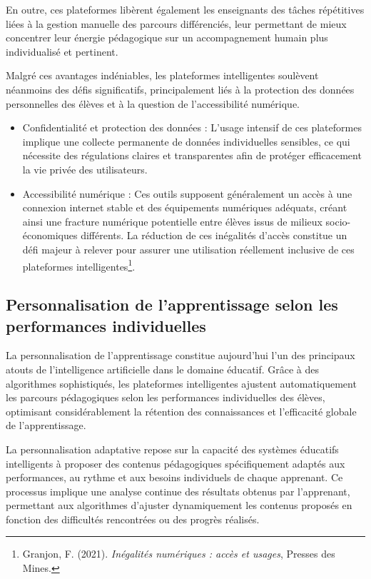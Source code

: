 \documentclass[11pt,a4paper]{report}
\begin{document}
En outre, ces plateformes libèrent également les enseignants des tâches répétitives liées à la gestion manuelle des parcours différenciés, leur permettant de mieux concentrer leur énergie pédagogique sur un accompagnement humain plus individualisé et pertinent.

Malgré ces avantages indéniables, les plateformes intelligentes soulèvent néanmoins des défis significatifs, principalement liés à la protection des données personnelles des élèves et à la question de l’accessibilité numérique.

\begin{itemize}

    \item Confidentialité et protection des données :
L’usage intensif de ces plateformes implique une collecte permanente de données individuelles sensibles, ce qui nécessite des régulations claires et transparentes afin de protéger efficacement la vie privée des utilisateurs.

    \item Accessibilité numérique :
Ces outils supposent généralement un accès à une connexion internet stable et des équipements numériques adéquats, créant ainsi une fracture numérique potentielle entre élèves issus de milieux socio-économiques différents. La réduction de ces inégalités d’accès constitue un défi majeur à relever pour assurer une utilisation réellement inclusive de ces plateformes intelligentes\footnote{Granjon, F. (2021). \textit{Inégalités numériques : accès et usages}, Presses des Mines.}.

\end{itemize}

\subsection{Personnalisation de l’apprentissage selon les performances individuelles}

La personnalisation de l’apprentissage constitue aujourd’hui l’un des principaux atouts de l’intelligence artificielle dans le domaine éducatif. Grâce à des algorithmes sophistiqués, les plateformes intelligentes ajustent automatiquement les parcours pédagogiques selon les performances individuelles des élèves, optimisant considérablement la rétention des connaissances et l’efficacité globale de l’apprentissage.

La personnalisation adaptative repose sur la capacité des systèmes éducatifs intelligents à proposer des contenus pédagogiques spécifiquement adaptés aux performances, au rythme et aux besoins individuels de chaque apprenant. Ce processus implique une analyse continue des résultats obtenus par l’apprenant, permettant aux algorithmes d’ajuster dynamiquement les contenus proposés en fonction des difficultés rencontrées ou des progrès réalisés.
\end{document}
